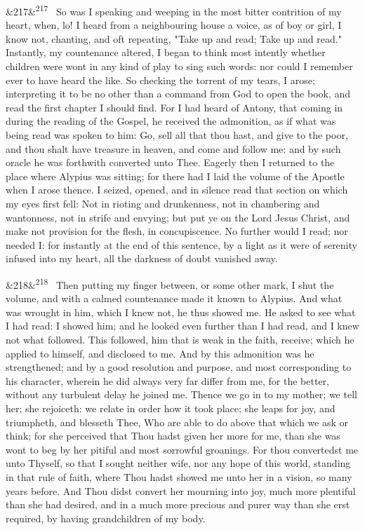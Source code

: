 \documentclass[12pt]{article}
\newcommand{\para}[1][]{\par\noindent\ifx&#1&\else\textsuperscript{\footnotesize #1}~\fi}
\begin{document}
\para[217] So was I speaking and weeping in the most bitter contrition of my heart, when, lo! I heard from a neighbouring house a voice, as of boy or girl, I know not, chanting, and oft repeating, "Take up and read; Take up and read." Instantly, my countenance altered, I began to think most intently whether children were wont in any kind of play to sing such words: nor could I remember ever to have heard the like. So checking the torrent of my tears, I arose; interpreting it to be no other than a command from God to open the book, and read the first chapter I should find. For I had heard of Antony, that coming in during the reading of the Gospel, he received the admonition, as if what was being read was spoken to him: Go, sell all that thou hast, and give to the poor, and thou shalt have treasure in heaven, and come and follow me: and by such oracle he was forthwith converted unto Thee. Eagerly then I returned to the place where Alypius was sitting; for there had I laid the volume of the Apostle when I arose thence. I seized, opened, and in silence read that section on which my eyes first fell: Not in rioting and drunkenness, not in chambering and wantonness, not in strife and envying; but put ye on the Lord Jesus Christ, and make not provision for the flesh, in concupiscence. No further would I read; nor needed I: for instantly at the end of this sentence, by a light as it were of serenity infused into my heart, all the darkness of doubt vanished away.

\para[218] Then putting my finger between, or some other mark, I shut the volume, and with a calmed countenance made it known to Alypius. And what was wrought in him, which I knew not, he thus showed me. He asked to see what I had read: I showed him; and he looked even further than I had read, and I knew not what followed. This followed, him that is weak in the faith, receive; which he applied to himself, and disclosed to me. And by this admonition was he strengthened; and by a good resolution and purpose, and most corresponding to his character, wherein he did always very far differ from me, for the better, without any turbulent delay he joined me. Thence we go in to my mother; we tell her; she rejoiceth: we relate in order how it took place; she leaps for joy, and triumpheth, and blesseth Thee, Who are able to do above that which we ask or think; for she perceived that Thou hadst given her more for me, than she was wont to beg by her pitiful and most sorrowful groanings. For thou convertedst me unto Thyself, so that I sought neither wife, nor any hope of this world, standing in that rule of faith, where Thou hadst showed me unto her in a vision, so many years before. And Thou didst convert her mourning into joy, much more plentiful than she had desired, and in a much more precious and purer way than she erst required, by having grandchildren of my body.
\end{document}
